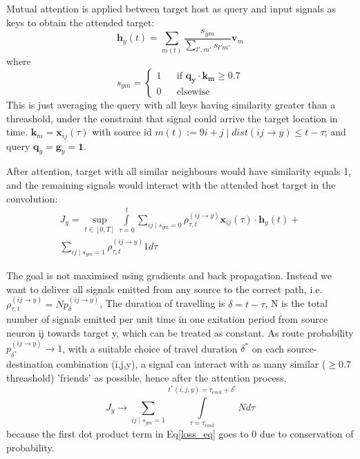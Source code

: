 \documentclass[11pt,a4paper]{article}
\begin{document}
\begin{multicols}{2}
Mutual attention is applied between target host as query and input signals as keys to obtain the attended target:
$$
\boldsymbol{h}_{y}(t)=\sum\limits_{m(t)} \frac {s_{ym}} {\sum\limits_{l',m'} s_{l'm'}} \boldsymbol{v}_{m}
$$
where 
\begin{equation}
s_{ym} = \left \{ 
\begin{array}{rcl}
1 & & \text{if } \boldsymbol{q_y}\cdot\boldsymbol{k_m} \ge 0.7 \\
0 & & \text{elsewise}
\end{array}
\right .
\label{threashold-attn}
\end{equation}
This is just averaging the query with all keys having similarity greater than a threashold, under the constraint that signal could arrive the target location in time.  
$\boldsymbol{k}_m = \boldsymbol{x}_{ij}(\tau)$ with source id $m(t):=9i+j \mid dist(ij\rightarrow y) \le t-\tau$; and query $\boldsymbol{q}_y=\boldsymbol{g}_y = \boldsymbol{1}$.

After attention, target with all similar neighbours would have similarity equals 1, and the remaining signals would interact with the attended host target in the convolution: 
\begin{equation}
\begin{split}
J_y=\sup_{t \in [0,T]} \int\limits_{\tau=0}^{t} \sum\limits_{ij \mid s_{ym}=0}\rho_{\tau,t}^{(ij \rightarrow y)} \boldsymbol{x}_{ij}(\tau) \cdot \boldsymbol{h}_y(t) + \\
 \sum\limits_{ij \mid s_{ym}=1} \rho_{\tau,t}^{(ij \rightarrow y)} 1 d\tau
\end{split}
 \label{loss_eq}
\end{equation}

The goal is not maximised using gradients and back propagation. Instead we want to deliver all signals emitted from any source to the correct path, i.e. 
$\rho_{\tau,t}^{(ij \rightarrow y)} = N p_{\delta}^{(ij \rightarrow y)}$, The duration of travelling is $\delta=t-\tau$, N is the total number of signals emitted per unit time in one exitation period from source neuron ij towards target y, which can be treated as constant. 
As route probability $p_{\delta^*}^{(ij \rightarrow y)} \rightarrow 1$, with a suitable choice of travel duration $\delta^*$ on each source-destination combination (i,j,y), a signal can interact with as many similar ($\ge 0.7$ threashold) 'friends' as possible, hence after the attention process, 
$$J_y \rightarrow \sum\limits_{ij \mid s_{ym}=1} \int\limits_{\tau=\tau_{emit}}^{t^*(i,j,y)=\tau_{emit}+\delta^*} N d\tau$$
because the first dot product term in Eq\ref{loss_eq} goes to 0 due to conservation of probability.


\end{multicols}
\end{document}
